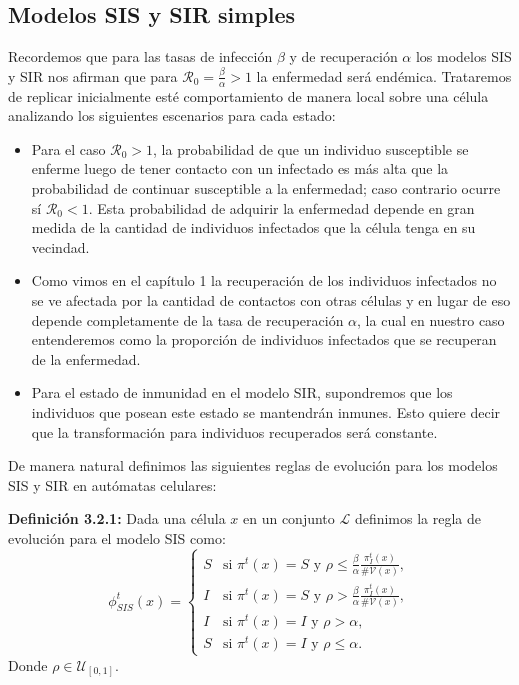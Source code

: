 \subsection{Modelos SIS y SIR simples}

Recordemos que para las tasas de infección $\beta$ y de recuperación $\alpha$ los modelos SIS y SIR nos afirman que para $\mathcal{R}_0=\frac{\beta}{\alpha}>1$ la enfermedad será endémica. Trataremos de replicar inicialmente esté comportamiento de manera local sobre una célula analizando los siguientes escenarios para cada estado:

\begin{itemize}
    \item Para el caso $\mathcal{R}_0>1$, la probabilidad de que un individuo susceptible se enferme luego de tener contacto con un infectado es más alta que la probabilidad de continuar susceptible a la enfermedad; caso contrario ocurre sí $\mathcal{R}_0<1$. Esta probabilidad de adquirir la enfermedad depende en gran medida de la cantidad de individuos infectados que la célula tenga en su vecindad. 
    
    \item Como vimos en el capítulo 1 la recuperación de los individuos infectados no se ve afectada por la cantidad de contactos con otras células y en lugar de eso depende completamente de la tasa de recuperación $\alpha$, la cual en nuestro caso entenderemos como la proporción de individuos infectados que se recuperan de la enfermedad.
    
    \item Para el estado de inmunidad en el modelo SIR, supondremos que los individuos que posean este estado se mantendrán inmunes. Esto quiere decir que la transformación para individuos recuperados será constante.
\end{itemize}

De manera natural definimos las siguientes reglas de evolución para los modelos SIS y SIR en autómatas celulares:

\textbf{Definición 3.2.1:} Dada una célula $x$ en un conjunto $\mathcal{L}$ definimos la regla de evolución para el modelo SIS como:
\begin{equation}
    \phi_{SIS}^t(x)=\left\{\begin{array}{ll}
        S & \text{si }\pi^t(x)=S\text{ y }\rho\leq\frac{\beta}{\alpha}\frac{\pi_I^t(x)}{\#\mathcal{V}(x)}, \\
        I & \text{si }\pi^t(x)=S\text{ y }\rho>\frac{\beta}{\alpha}\frac{\pi_I^t(x)}{\#\mathcal{V}(x)}, \\
        I & \text{si }\pi^t(x)=I\text{ y }\rho>\alpha,\\
        S & \text{si }\pi^t(x)=I\text{ y }\rho\leq\alpha.
    \end{array}\right.
\end{equation}
Donde $\rho\in\mathcal{U}_{[0,1]}$.
    
